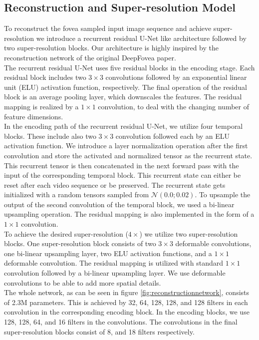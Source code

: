\documentclass[10pt,twocolumn,letterpaper]{article}
\newcommand{\Gaussian}[1]{\mathcal{N}\left(#1\right)}
\begin{document}
\subsection{Reconstruction and Super-resolution Model} \label{subsec:reconstructionsuperresmodel}
To reconstruct the fovea sampled input image sequence and achieve super-resolution we introduce a recurrent residual U-Net like architecture followed by two super-resolution blocks. Our architecture is highly inspired by the reconstruction network of the original DeepFovea paper. \cite{deepfovea}\\
The recurrent residual U-Net uses five residual blocks in the encoding stage. Each residual block includes two $3\times 3$ convolutions followed by an exponential linear unit (ELU) \cite{elu} activation function, respectively. The final operation of the residual block is an average pooling layer, which downscales the features. The residual mapping is realized by a $1 \times 1$ convolution, to deal with the changing number of feature dimensions.\\
In the encoding path of the recurrent residual U-Net, we utilize four temporal blocks. These include also two $3\times 3$ convolution followed each by an ELU activation function. We introduce a layer normalization \cite{layernorm} operation after the first convolution and store the activated and normalized tensor as the recurrent state. This recurrent tensor is then concatenated in the next forward pass with the input of the corresponding temporal block. This recurrent state can either be reset after each video sequence or be preserved. The recurrent state gets initialized with a random tensors sampled from $\Gaussian{0.0; 0.02}$. To upsample the output of the second convolution of the temporal block, we used a bi-linear upsampling operation. The residual mapping is also implemented in the form of a $1\times 1$ convolution.\\
To achieve the desired super-resolution ($4\times$) we utilize two super-resolution blocks. One super-resolution block consists of two $3\times 3$ deformable convolutions, one bi-linear upsampling layer, two ELU activation functions, and a $1\times 1$ deformable convolution. The residual mapping is utilized with standard $1\times 1$ convolution followed by a bi-linear upsampling layer. We use deformable convolutions to be able to add more spatial details.\\
The whole network, as can be seen in figure \ref{fig:reconstructionnetwork}, consists of 2.3M parameters. This is achieved by 32, 64, 128, 128, and 128 filters in each convolution in the corresponding encoding block. In the encoding blocks, we use 128, 128, 64, and 16 filters in the convolutions. The convolutions in the final super-resolution blocks consist of 8, and 18 filters respectively.
\end{document}
